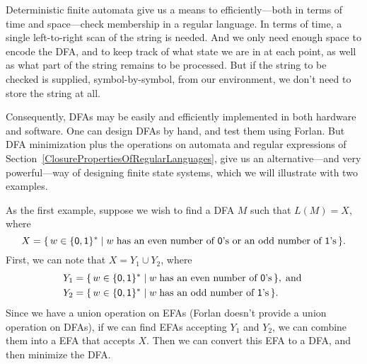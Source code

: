 %

Deterministic finite automata give us a means to efficiently---both in
terms of time and space---check membership in a regular language.  In
terms of time, a single left-to-right scan of the string is needed.
And we only need enough space to encode the DFA, and to keep track of
what state we are in at each point, as well as what part of the string
remains to be processed.  But if the string to be checked is
supplied, symbol-by-symbol, from our environment, we don't need to
store the string at all.

Consequently, DFAs may be easily and efficiently implemented in both
hardware and software.  One can design DFAs by hand, and test them
using Forlan.  But DFA minimization plus the operations on automata
and regular expressions of
Section~\ref{ClosurePropertiesOfRegularLanguages}, give us an
alternative---and very powerful---way of designing finite state
systems, which we will illustrate with two examples.

As the first example, suppose we wish to find a DFA $M$ such that
$L(M)=X$, where
\begin{displaymath}
X=\{ \, w\in\mathsf{\{0,1\}^*} \mid w\;\allowbreak\mbox{has an even
    number of $\mathsf{0}$'s or an odd number of $\mathsf{1}$'s}\allowbreak \, \} .  
\end{displaymath}
First, we can note that $X=Y_1\cup Y_2$, where
\begin{align*}
Y_1 &= \{ \, w\in\mathsf{\{0,1\}^*} \mid w\;\allowbreak\mbox{has an even
    number of $\mathsf{0}$'s}\allowbreak \, \}, \;\allowbreak\mbox{and}\allowbreak\; \\
Y_2 &= \{ \, w\in\mathsf{\{0,1\}^*} \mid w\;\allowbreak\mbox{has an odd number of
    $\mathsf{1}$'s}\allowbreak \, \}.
\end{align*}
Since we have a union operation on EFAs (Forlan
doesn't provide a union operation on DFAs), if we can find EFAs
accepting $Y_1$ and $Y_2$, we can combine them into a EFA that accepts
$X$.  Then we can convert this EFA to a DFA, and then minimize the
DFA.

